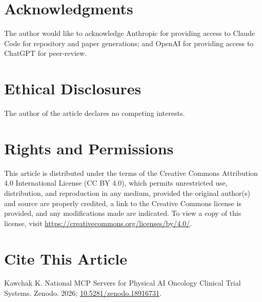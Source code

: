 \documentclass{article}
\begin{document}
\section*{Acknowledgments}

The author would like to acknowledge Anthropic for providing access to Claude Code for repository and paper generations; and OpenAI for providing access to ChatGPT for peer-review.

\section*{Ethical Disclosures}

The author of the article declares no competing interests.

\section*{Rights and Permissions}

This article is distributed under the terms of the Creative Commons Attribution 4.0 International License (CC BY 4.0), which permits unrestricted use, distribution, and reproduction in any medium, provided the original author(s) and source are properly credited, a link to the Creative Commons license is provided, and any modifications made are indicated. To view a copy of this license, visit \url{https://creativecommons.org/licenses/by/4.0/}.

\section*{Cite This Article}

Kawchak K. National MCP Servers for Physical AI Oncology Clinical Trial Systems. Zenodo. 2026; \href{https://doi.org/10.5281/zenodo.18916731}{10.5281/zenodo.18916731}.
\end{document}
